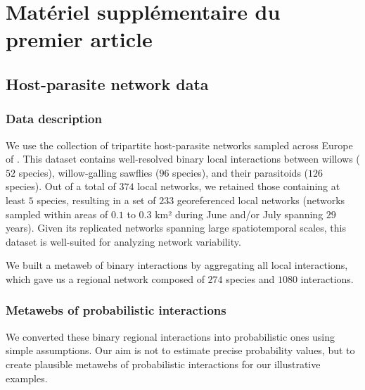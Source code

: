 

\chapter{Matériel supplémentaire du premier article}\label{supp:A}


\begin{refsection}


\section{Host-parasite network data}

\subsection{Data description}

We use the collection of tripartite host-parasite networks sampled across Europe
of \textcite{Kopelke2017Foodweb}. This dataset contains well-resolved binary local
interactions between willows ($52$ species), willow-galling sawflies ($96$
species), and their parasitoids ($126$ species). Out of a total of $374$ local
networks, we retained those containing at least $5$ species, resulting in a set
of $233$ georeferenced local networks (networks sampled within areas of $0.1$ to
$0.3$ km² during June and/or July spanning $29$ years). Given its replicated
networks spanning large spatiotemporal scales, this dataset is well-suited for
analyzing network variability.

We built a metaweb of binary interactions by aggregating all local interactions,
which gave us a regional network composed of $274$ species and $1080$
interactions. 

\subsection{Metawebs of probabilistic interactions}

We converted these binary regional interactions into probabilistic ones using
simple assumptions. Our aim is not to estimate precise probability values, but
to create plausible metawebs of probabilistic interactions for our illustrative
examples. 


\end{refsection}
